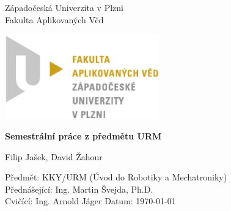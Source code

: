 \begin{titlepage}
    \begin{center}
        \LARGE
        Západočeská Univerzita v Plzni\\
        Fakulta Aplikovaných Věd\\
        
        \vspace{1cm}
        
        \includegraphics[width=0.5\textwidth]{./Graphics/FAV_logo.pdf}
        
        \vspace{4cm}
        
        \textbf{Semestrální práce z předmětu URM}
        
        \vspace{0.5cm}
        Filip Jašek, David Žahour
        
    \end{center} 
    \vfill
        \noindent
        \large
        Předmět: KKY/URM (Úvod do Robotiky a Mechatroniky)\\
        Přednášející: Ing. Martin Švejda, Ph.D.\\
        Cvičící: Ing. Arnold Jáger \hfill Datum: \today
\end{titlepage}